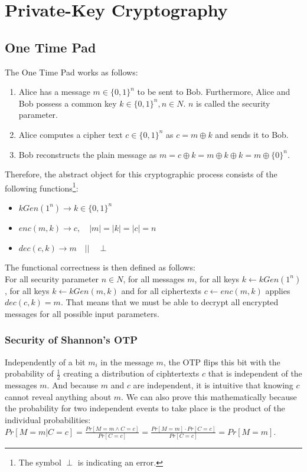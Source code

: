 \chapter{Private-Key Cryptography}

\section{One Time Pad}

The One Time Pad works as follows:

\begin{enumerate}
    \item Alice has a message $m \in \{0,1\}^n$ to be sent to Bob. Furthermore, Alice and Bob possess a common key $k \in \{0,1\}^n, n\in N$. $n$ is called the security parameter.
    \item Alice computes a cipher text $c \in \{0,1\}^{n}$ as $c = m \oplus k$ and sends it to Bob.
    \item Bob reconstructs the plain message as $m = c \oplus k = m \oplus k \oplus k = m \oplus \{0\}^{n}$.
\end{enumerate}

Therefore, the abstract object for this cryptographic process consists of the following functions\footnote{The symbol $\perp$ is indicating an error.}:

\begin{itemize}
    \item $kGen(1^{n}) \rightarrow k \in \{0,1\}^{n}$
    \item $enc(m, k) \rightarrow c, \quad |m| = |k| = |c| = n$
    \item $dec(c, k) \rightarrow m \quad || \quad \perp$
\end{itemize}

The functional correctness is then defined as follows:\\
For all security parameter $n \in N$, for all messages $m$, for all keys $k \leftarrow kGen(1^{n})$, for all keys $k \leftarrow kGen(m,k)$ and for all ciphertexts $c \leftarrow enc(m,k)$ applies $dec(c,k) = m$. That means that we must be able to decrypt all encrypted messages for all possible input parameters.

\subsection*{Security of Shannon's OTP}

Independently of a bit $m_i$ in the message $m$, the OTP flips this bit with the probability of $\frac{1}{2}$ creating a distribution of ciphtertexts $c$ that is independent of the messages $m$. And because $m$ and $c$ are independent, it is intuitive that knowing $c$ cannot reveal anything about $m$. We can also prove this mathematically because the probability for two independent events to take place is the product of the individual probabilities: $Pr[M=m | C=c] = \frac{Pr[M=m \wedge C=c]}{Pr[C=c]} = \frac{Pr[M=m] \cdot Pr[C=c]}{Pr[C=c]} = Pr[M=m]$.


